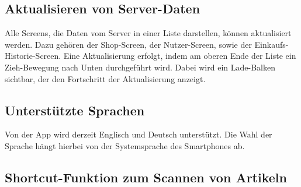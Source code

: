 \subsection{Aktualisieren von Server-Daten}\label{subsec:aktualisieren-von-server-daten}

Alle Screens, die Daten vom Server in einer Liste darstellen, können aktualisiert werden.
Dazu gehören der Shop-Screen, der Nutzer-Screen, sowie der Einkaufs-Historie-Screen.
Eine Aktualisierung erfolgt, indem am oberen Ende der Liste ein Zieh-Bewegung nach Unten durchgeführt wird.
Dabei wird ein Lade-Balken sichtbar, der den Fortschritt der Aktualisierung anzeigt.

\subsection{Unterstützte Sprachen} \label{subsec:languages}

Von der App wird derzeit Englisch und Deutsch unterstützt.
Die Wahl der Sprache hängt hierbei von der Systemsprache des Smartphones ab.

\subsection{Shortcut-Funktion zum Scannen von Artikeln} \label{subsec:scan-item-shortcut}
